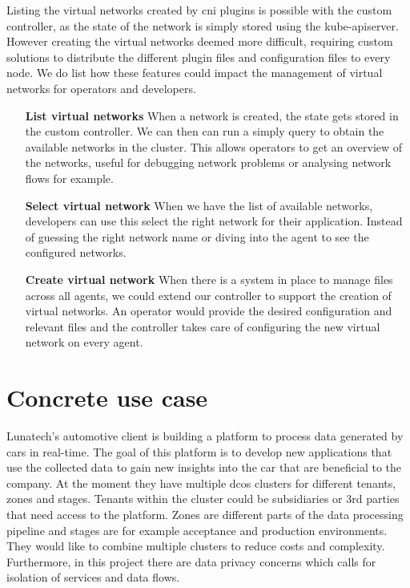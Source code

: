 Listing the virtual networks created by \gls{cni} plugins is possible with the custom controller, as the state of the network is simply stored using the kube-apiserver. However creating the virtual networks deemed more difficult, requiring custom solutions to distribute the different plugin files and configuration files to every node. We do list how these features could impact the management of virtual networks for operators and developers.
\begin{itemize}
    \item[\textbf{List virtual networks}] When a network is created, the state gets stored in the custom controller. We can then can run a simply query to obtain the available networks in the cluster. This allows operators to get an overview of the networks, useful for debugging network problems or analysing network flows for example.
    \item[\textbf{Select virtual network}] When we have the list of available networks, developers can use this select the right network for their application. Instead of guessing the right network name or diving into the agent to see the configured networks.
    \item[\textbf{Create virtual network}] When there is a system in place to manage files across all agents, we could extend our controller to support the creation of virtual networks. An operator would provide the desired configuration and relevant files and the controller takes care of configuring the new virtual network on every agent. 
\end{itemize}

\section{Concrete use case}
Lunatech's automotive client is building a platform to process data generated by cars in real-time. The goal of this platform is to develop new applications that use the collected data to gain new insights into the car that are beneficial to the company. At the moment they have multiple \gls{dcos} clusters for different tenants, zones and stages. Tenants within the cluster could be subsidiaries or 3rd parties that need access to the platform. Zones are different parts of the data processing pipeline and stages are for example acceptance and production environments. They would like to combine multiple clusters to reduce costs and complexity. Furthermore, in this project there are data privacy concerns which calls for isolation of services and data flows.

